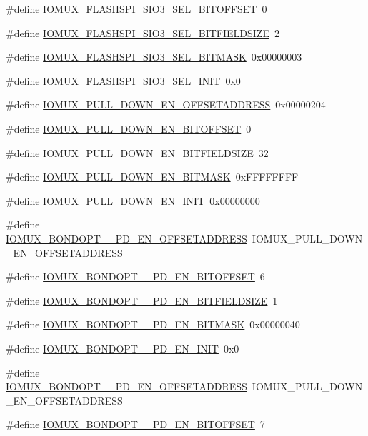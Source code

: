 \begin{DoxyCompactItemize}
\#define \hyperlink{a00560_aee8aa125a7b79ce0dd556116efb95858}{IOMUX\_\-FLASHSPI\_\-SIO3\_\-SEL\_\-BITOFFSET}~0
\item 
\#define \hyperlink{a00560_ac03472a3fdeb156179f2fc25dea0b246}{IOMUX\_\-FLASHSPI\_\-SIO3\_\-SEL\_\-BITFIELDSIZE}~2
\item 
\#define \hyperlink{a00560_a54c8e65b41a25ebf5a260a438feba1d9}{IOMUX\_\-FLASHSPI\_\-SIO3\_\-SEL\_\-BITMASK}~0x00000003
\item 
\#define \hyperlink{a00560_a6db3d5272139db2f4d6191827fbf0fe0}{IOMUX\_\-FLASHSPI\_\-SIO3\_\-SEL\_\-INIT}~0x0
\item 
\#define \hyperlink{a00560_a5a012615f54aa34d8defe8da5cd1e1a9}{IOMUX\_\-PULL\_\-DOWN\_\-EN\_\-OFFSETADDRESS}~0x00000204
\item 
\#define \hyperlink{a00560_a09a83a3e51e16afaf5e68bf7ad43ba6b}{IOMUX\_\-PULL\_\-DOWN\_\-EN\_\-BITOFFSET}~0
\item 
\#define \hyperlink{a00560_a2d317662f7cc330d7f3df0d5c7626789}{IOMUX\_\-PULL\_\-DOWN\_\-EN\_\-BITFIELDSIZE}~32
\item 
\#define \hyperlink{a00560_a581011ceb3ff37d6cfd0cbbe0206ea40}{IOMUX\_\-PULL\_\-DOWN\_\-EN\_\-BITMASK}~0xFFFFFFFF
\item 
\#define \hyperlink{a00560_aa673ff477c0fe142ea5a9fc008566369}{IOMUX\_\-PULL\_\-DOWN\_\-EN\_\-INIT}~0x00000000
\item 
\#define \hyperlink{a00560_af98038ac513c0970d5ae3f97534a16d6}{IOMUX\_\-BONDOPT\_\_\-PD\_\-EN\_\-OFFSETADDRESS}~IOMUX\_\-PULL\_\-DOWN\_\-EN\_\-OFFSETADDRESS
\item 
\#define \hyperlink{a00560_a65a415dedc65175ca36376287eee7f2e}{IOMUX\_\-BONDOPT\_\_\-PD\_\-EN\_\-BITOFFSET}~6
\item 
\#define \hyperlink{a00560_a71b24974d0e116e0d70475bed1daa86f}{IOMUX\_\-BONDOPT\_\_\-PD\_\-EN\_\-BITFIELDSIZE}~1
\item 
\#define \hyperlink{a00560_ac3c86ef2489a33b3beb244d5379687e6}{IOMUX\_\-BONDOPT\_\_\-PD\_\-EN\_\-BITMASK}~0x00000040
\item 
\#define \hyperlink{a00560_ac57ff1c8c76a094d5d905fd295dbd41e}{IOMUX\_\-BONDOPT\_\_\-PD\_\-EN\_\-INIT}~0x0
\item 
\#define \hyperlink{a00560_a3bd5e002e7a8c684af05a5e2f66a2a27}{IOMUX\_\-BONDOPT\_\_\-PD\_\-EN\_\-OFFSETADDRESS}~IOMUX\_\-PULL\_\-DOWN\_\-EN\_\-OFFSETADDRESS
\item 
\#define \hyperlink{a00560_aaaabe1a54293c5bc7acc362584e99f5a}{IOMUX\_\-BONDOPT\_\_\-PD\_\-EN\_\-BITOFFSET}~7
\item 

\end{DoxyCompactItemize}
